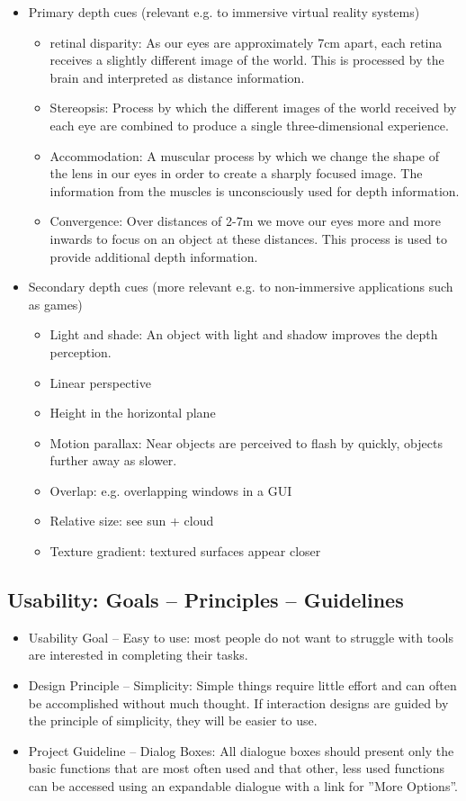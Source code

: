 \begin{itemize}
\item Primary depth cues (relevant e.g. to immersive virtual reality systems)
\begin{itemize}
\item retinal disparity: As our eyes are approximately 7cm apart, each retina receives a slightly different image of the world. This is processed by the brain and interpreted as distance information.
\item Stereopsis: Process by which the different images of the world received by each eye are combined to produce a single three-dimensional experience.
\item Accommodation: A muscular process by which we change the shape of the lens in our eyes in order to create a sharply focused image. The information from the muscles is unconsciously used for depth information.
\item Convergence: Over distances of 2-7m we move our eyes more and more inwards to focus on an object at these distances. This process is used to provide additional depth information.
\end{itemize}
\item Secondary depth cues (more relevant e.g. to non-immersive applications such as games)
\begin{itemize}
\item Light and shade: An object with light and shadow improves the depth perception.
\item Linear perspective
\item Height in the horizontal plane
\item Motion parallax: Near objects are perceived to flash by quickly, objects further away as slower.
\item Overlap: e.g. overlapping windows in a GUI
\item Relative size: see sun + cloud
\item Texture gradient: textured surfaces appear closer
\end{itemize}
\end{itemize}
\subsection{Usability: Goals -- Principles -- Guidelines}
\begin{itemize}
\item Usability Goal -- Easy to use: most people do not want to struggle with tools are interested in completing their tasks.
\item Design Principle -- Simplicity: Simple things require little effort and can often be accomplished without much thought. If interaction designs are guided by the principle of simplicity, they will be easier to use.
\item Project Guideline -- Dialog Boxes: All dialogue boxes should present only the basic functions that are most often used and that other, less used functions can be accessed using an expandable dialogue with a link for ''More Options”.
\end{itemize}
